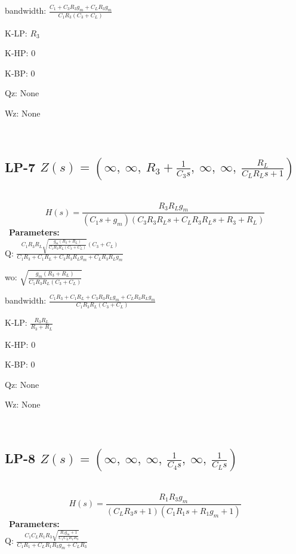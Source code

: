 \documentclass{article}
\begin{document}
bandwidth: $\frac{C_{1} + C_{3} R_{3} g_{m} + C_{L} R_{3} g_{m}}{C_{1} R_{3} \left(C_{3} + C_{L}\right)}$\ 

K-LP: $R_{3}$\ 

K-HP: $0$\ 

K-BP: $0$\ 

Qz: $\text{None}$\ 

Wz: $\text{None}$\ 

\ 

\subsection{LP-7 $Z(s) = \left( \infty, \  \infty, \  R_{3} + \frac{1}{C_{3} s}, \  \infty, \  \infty, \  \frac{R_{L}}{C_{L} R_{L} s + 1}\right)$ } \ 
\textbf{\[H(s) = \frac{R_{3} R_{L} g_{m}}{\left(C_{1} s + g_{m}\right) \left(C_{3} R_{3} R_{L} s + C_{L} R_{3} R_{L} s + R_{3} + R_{L}\right)}\] } \ 
\textbf{Parameters:}\\ 

Q: $\frac{C_{1} R_{3} R_{L} \sqrt{\frac{g_{m} \left(R_{3} + R_{L}\right)}{C_{1} R_{3} R_{L} \left(C_{3} + C_{L}\right)}} \left(C_{3} + C_{L}\right)}{C_{1} R_{3} + C_{1} R_{L} + C_{3} R_{3} R_{L} g_{m} + C_{L} R_{3} R_{L} g_{m}}$\ 

wo: $\sqrt{\frac{g_{m} \left(R_{3} + R_{L}\right)}{C_{1} R_{3} R_{L} \left(C_{3} + C_{L}\right)}}$\ 

bandwidth: $\frac{C_{1} R_{3} + C_{1} R_{L} + C_{3} R_{3} R_{L} g_{m} + C_{L} R_{3} R_{L} g_{m}}{C_{1} R_{3} R_{L} \left(C_{3} + C_{L}\right)}$\ 

K-LP: $\frac{R_{3} R_{L}}{R_{3} + R_{L}}$\ 

K-HP: $0$\ 

K-BP: $0$\ 

Qz: $\text{None}$\ 

Wz: $\text{None}$\ 

\ 

\subsection{LP-8 $Z(s) = \left( \infty, \  \infty, \  \infty, \  \frac{1}{C_{4} s}, \  \infty, \  \frac{1}{C_{L} s}\right)$ } \ 
\textbf{\[H(s) = \frac{R_{1} R_{3} g_{m}}{\left(C_{L} R_{3} s + 1\right) \left(C_{1} R_{1} s + R_{1} g_{m} + 1\right)}\] } \ 
\textbf{Parameters:}\\ 

Q: $\frac{C_{1} C_{L} R_{1} R_{3} \sqrt{\frac{R_{1} g_{m} + 1}{C_{1} C_{L} R_{1} R_{3}}}}{C_{1} R_{1} + C_{L} R_{1} R_{3} g_{m} + C_{L} R_{3}}$\ 
\end{document}
